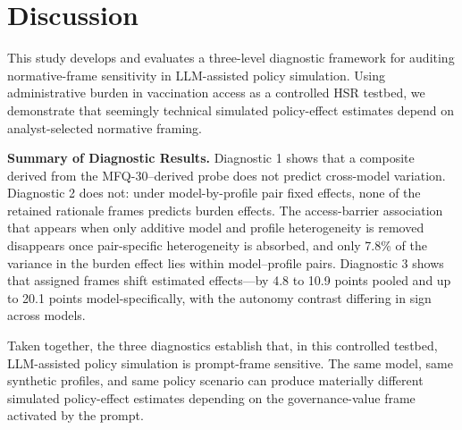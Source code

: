 \documentclass[12pt,a4paper]{article}
\begin{document}
\section{Discussion}
\label{sec:discussion}

This study develops and evaluates a three-level diagnostic framework for auditing normative-frame sensitivity in LLM-assisted policy simulation. Using administrative burden in vaccination access as a controlled HSR testbed, we demonstrate that seemingly technical simulated policy-effect estimates depend on analyst-selected normative framing.

\textbf{Summary of Diagnostic Results.} Diagnostic 1 shows that a composite derived from the MFQ-30--derived probe does not predict cross-model variation. Diagnostic 2 does not: under model-by-profile pair fixed effects, none of the retained rationale frames predicts burden effects. The access-barrier association that appears when only additive model and profile heterogeneity is removed disappears once pair-specific heterogeneity is absorbed, and only 7.8\% of the variance in the burden effect lies within model--profile pairs. Diagnostic 3 shows that assigned frames shift estimated effects---by 4.8 to 10.9 points pooled and up to 20.1 points model-specifically, with the autonomy contrast differing in sign across models.

Taken together, the three diagnostics establish that, in this controlled testbed, LLM-assisted policy simulation is prompt-frame sensitive. The same model, same synthetic profiles, and same policy scenario can produce materially different simulated policy-effect estimates depending on the governance-value frame activated by the prompt.
\end{document}
